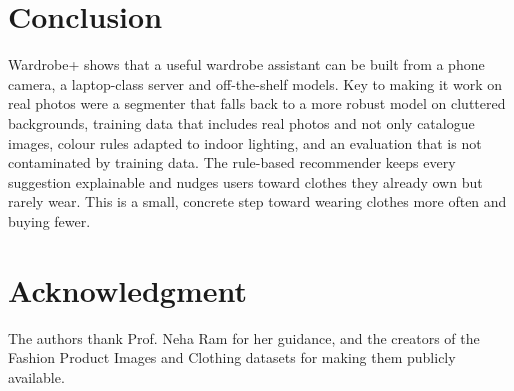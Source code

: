 \documentclass[conference]{IEEEtran}
\begin{document}
\section{Conclusion}
Wardrobe+ shows that a useful wardrobe assistant can be built from a phone camera, a laptop-class server and off-the-shelf models. Key to making it work on real photos were a segmenter that falls back to a more robust model on cluttered backgrounds, training data that includes real photos and not only catalogue images, colour rules adapted to indoor lighting, and an evaluation that is not contaminated by training data. The rule-based recommender keeps every suggestion explainable and nudges users toward clothes they already own but rarely wear. This is a small, concrete step toward wearing clothes more often and buying fewer.

\section*{Acknowledgment}
The authors thank Prof. Neha Ram for her guidance, and the creators of the Fashion Product Images and Clothing datasets for making them publicly available.
\end{document}
